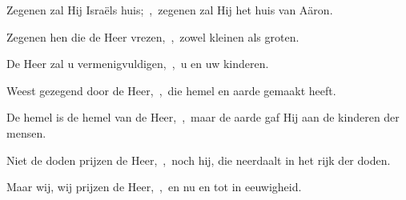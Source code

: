 \documentclass[12pt,twoside,a5paper]{article}
\begin{document}
\begin{halfparskip}
  Zegenen zal Hij Israëls huis;~\sep\ zegenen zal Hij het huis van Aäron.

  Zegenen hen die de Heer vrezen,~\sep\ zowel kleinen als groten.

  De Heer zal u vermenigvuldigen,~\sep\ u en uw kinderen.

  Weest gezegend door de Heer,~\sep\ die hemel en aarde gemaakt heeft.

  De hemel is de hemel van de Heer,~\sep\ maar de aarde gaf Hij aan de kinderen der mensen.

  Niet de doden prijzen de Heer,~\sep\ noch hij, die neerdaalt in het rijk der doden.

  Maar wij, wij prijzen de Heer,~\sep\ en nu en tot in eeuwigheid.
\end{halfparskip}



\end{document}
